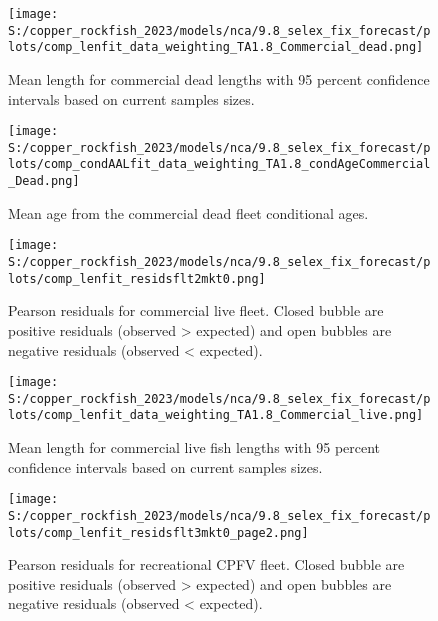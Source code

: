 \documentclass[11pt,
  english,
  letterpaper,
]{article}
\begin{document}
\pagebreak

\begin{figure}
\centering
\texttt{[image: S:/copper\_rockfish\_2023/models/nca/9.8\_selex\_fix\_forecast/plots/comp\_lenfit\_data\_weighting\_TA1.8\_Commercial\_dead.png]}
\caption{Mean length for commercial dead lengths with 95 percent confidence intervals based on current samples sizes.\label{fig:com-dead-mean-len-fit}}
\end{figure}

\pagebreak

\begin{figure}
\centering
\texttt{[image: S:/copper\_rockfish\_2023/models/nca/9.8\_selex\_fix\_forecast/plots/comp\_condAALfit\_data\_weighting\_TA1.8\_condAgeCommercial\_Dead.png]}
\caption{Mean age from the commercial dead fleet conditional ages.\label{fig:com-dead-mean-age}}
\end{figure}

\pagebreak

\begin{figure}
\centering
\texttt{[image: S:/copper\_rockfish\_2023/models/nca/9.8\_selex\_fix\_forecast/plots/comp\_lenfit\_residsflt2mkt0.png]}
\caption{Pearson residuals for commercial live fleet. Closed bubble are positive residuals (observed \textgreater{} expected) and open bubbles are negative residuals (observed \textless{} expected).\label{fig:com-live-pearson}}
\end{figure}

\pagebreak

\begin{figure}
\centering
\texttt{[image: S:/copper\_rockfish\_2023/models/nca/9.8\_selex\_fix\_forecast/plots/comp\_lenfit\_data\_weighting\_TA1.8\_Commercial\_live.png]}
\caption{Mean length for commercial live fish lengths with 95 percent confidence intervals based on current samples sizes.\label{fig:com-live-mean-len-fit}}
\end{figure}

\pagebreak

\begin{figure}
\centering
\texttt{[image: S:/copper\_rockfish\_2023/models/nca/9.8\_selex\_fix\_forecast/plots/comp\_lenfit\_residsflt3mkt0\_page2.png]}
\caption{Pearson residuals for recreational CPFV fleet. Closed bubble are positive residuals (observed \textgreater{} expected) and open bubbles are negative residuals (observed \textless{} expected).\label{fig:rec-cpfv-pearson}}
\end{figure}
\end{document}
